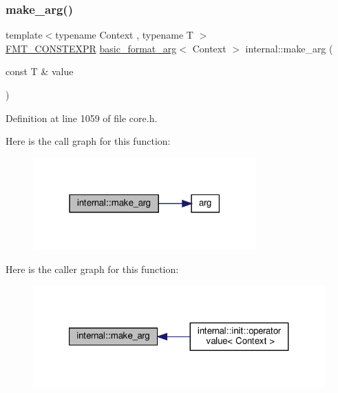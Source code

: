 \subsubsection{\texorpdfstring{make\+\_\+arg()}{make\_arg()}\hspace{0.1cm}{\footnotesize\ttfamily [1/3]}}
{\footnotesize\ttfamily template$<$typename Context , typename T $>$ \\
\hyperlink{core_8h_a69201cb276383873487bf68b4ef8b4cd}{F\+M\+T\+\_\+\+C\+O\+N\+S\+T\+E\+X\+PR} \hyperlink{classbasic__format__arg}{basic\+\_\+format\+\_\+arg}$<$ Context $>$ internal\+::make\+\_\+arg (\begin{DoxyParamCaption}\item[{const T \&}]{value }\end{DoxyParamCaption})}



Definition at line 1059 of file core.\+h.

Here is the call graph for this function\+:
\nopagebreak
\begin{figure}[H]
\begin{center}
\leavevmode
\includegraphics[width=243pt]{namespaceinternal_ac3d17a309d86929584064104267b6de4_cgraph}
\end{center}
\end{figure}
Here is the caller graph for this function\+:
\nopagebreak
\begin{figure}[H]
\begin{center}
\leavevmode
\includegraphics[width=321pt]{namespaceinternal_ac3d17a309d86929584064104267b6de4_icgraph}
\end{center}
\end{figure}
\mbox{\label{namespaceinternal_a04e85a8af8b4bd733c9e585ad3183aa5}} 
